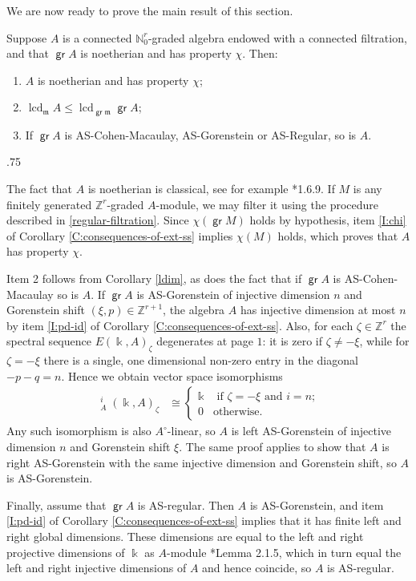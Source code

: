 \documentclass[11pt,fleqn]{article}
\makeatletter
\renewenvironment{proof}[1][\textit{Proof}]{\par
  \pushQED{\qed}%
  \normalfont \topsep.75\paraskip\relax
  \trivlist
  \item[\hskip\labelsep
        \itshape
    #1\@addpunct{.}]\ignorespaces
}{%
  \popQED\endtrivlist\@endpefalse
}
\newcommand\NN{\mathbb N}
\newcommand\ZZ{\mathbb Z}
\renewcommand\k{\Bbbk}
\newcommand\m{\mathfrak m}
\newcommand\opp{\circ}
\DeclareMathOperator\GrExt{\underline{\mathsf{Ext}}}
\DeclareMathOperator\gr{\mathsf{gr}}
\DeclareMathOperator\lcd{lcd}
\makeatother
\begin{document}

We are now ready to prove the main result of this section. 
\begin{Theorem}
\label{transfer}
Suppose $A$ is a connected $\NN_0^r$-graded algebra endowed with a connected 
filtration, and that $\gr A$ is noetherian and has property $\chi$. Then:
\begin{enumerate}
\item $A$ is noetherian and has property $\chi$;
\item $\lcd_\m A \leq \lcd_{\gr \m} \gr A$;
\item If $\gr A$ is AS-Cohen-Macaulay, AS-Gorenstein or AS-Regular, so is $A$.
\end{enumerate}
\end{Theorem}
\begin{proof}
The fact that $A$ is noetherian is classical, see for example \cite{MR}*{1.6.9}. If $M$ 
is any finitely generated $\ZZ^r$-graded $A$-module, we may filter it using the procedure
described in \ref{regular-filtration}. Since $\chi(\gr M)$ holds by hypothesis, item 
\ref{I:chi} of Corollary \ref{C:consequences-of-ext-ss} implies $\chi(M)$ holds, which 
proves that $A$ has property $\chi$. 

Item 2 follows from Corollary \ref{ldim}, as does the fact that if $\gr A$ is
AS-Cohen-Macaulay so is $A$. If $\gr A$ is AS-Gorenstein of injective dimension $n$ and
Gorenstein shift $(\xi, p) \in \ZZ^{r+1}$, the algebra $A$ has injective dimension at 
most $n$ by item \ref{I:pd-id} of Corollary \ref{C:consequences-of-ext-ss}. Also, for 
each $\zeta \in \ZZ^r$ the spectral sequence $E(\k, A)_\zeta$ degenerates at page $1$: 
it is zero if $\zeta \neq -\xi$, while for $\zeta = - \xi$ there is a single, one 
dimensional non-zero entry in the diagonal $-p-q = n$. Hence we obtain vector space
isomorphisms
\begin{align*}
  \GrExt^i_A(\k, A)_\zeta 
    &\cong  \begin{cases}
      \k & \mbox{ if  $\zeta = -\xi$ and $i = n$;} \\
      0 & \mbox{otherwise.}
    \end{cases}
\end{align*}
Any such isomorphism is also $A^\opp$-linear, so $A$ is left AS-Gorenstein of injective 
dimension $n$ and Gorenstein shift $\xi$. The same proof applies to show that $A$ is 
right AS-Gorenstein with the same injective dimension and Gorenstein shift, so $A$ is 
AS-Gorenstein. 

Finally, assume that $\gr A$ is AS-regular. Then $A$ is AS-Gorenstein, and item
\ref{I:pd-id} of Corollary \ref{C:consequences-of-ext-ss} implies that it has finite
left and right global dimensions. These dimensions are equal to the left and right 
projective dimensions of $\k$ as $A$-module \cite{RZ2}*{Lemma 2.1.5}, which in turn equal
the left and right injective dimensions of $A$ and hence coincide, so $A$ is AS-regular.
\end{proof}
\end{document}
